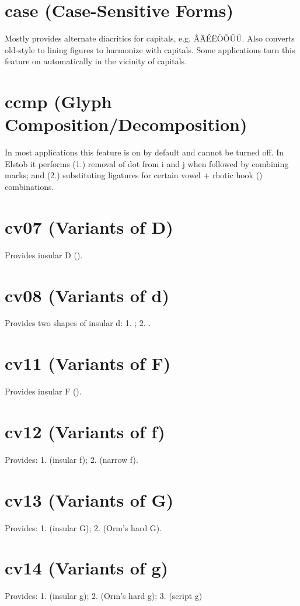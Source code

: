 \documentclass[12pt,letterpaper,openany]{book}
\begin{document}
\section{case (Case-Sensitive Forms)}
Mostly provides alternate diacritics for capitals, e.g. ÂÄÉËÒÕŰŪ. Also converts
old-style to lining figures to harmonize with capitals. Some applications turn
this feature on automatically in the vicinity of capitals.

\section{ccmp (Glyph Composition/Decomposition)}
In most applications this feature is on by default and cannot be turned off.
In Elstob it performs (1.) removal of dot from i and j when followed by combining
marks; and (2.) substituting ligatures for certain vowel + rhotic hook ()
combinations.

\section{cv07 (Variants of D)}
Provides insular D ().

\section{cv08 (Variants of d)}
Provides two shapes of insular d: 1. ; 2. .

\section{cv11 (Variants of F)}
Provides insular F ().

\section{cv12 (Variants of f)}
Provides: 1.  (insular f); 2.  (narrow f).

\section{cv13 (Variants of G)}
Provides: 1.  (insular G); 2.  (Orm's hard G).

\section{cv14 (Variants of g)}
Provides: 1.  (insular g); 2.  (Orm's hard g);
3.  (script g)
\end{document}
